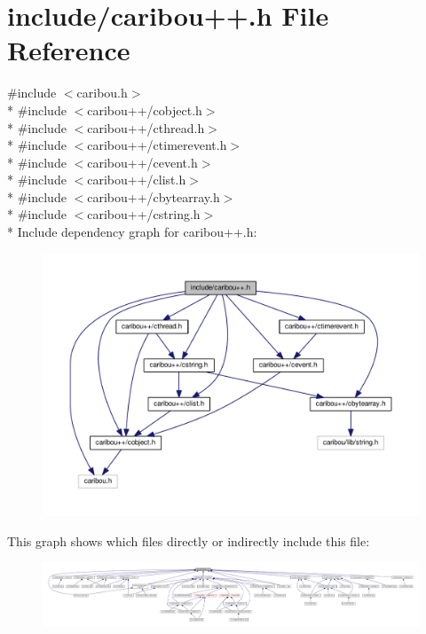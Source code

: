 \section{include/caribou++.h File Reference}
\label{caribou_09_09_8h}
{\ttfamily \#include $<$caribou.\-h$>$}\\*
{\ttfamily \#include $<$caribou++/cobject.\-h$>$}\\*
{\ttfamily \#include $<$caribou++/cthread.\-h$>$}\\*
{\ttfamily \#include $<$caribou++/ctimerevent.\-h$>$}\\*
{\ttfamily \#include $<$caribou++/cevent.\-h$>$}\\*
{\ttfamily \#include $<$caribou++/clist.\-h$>$}\\*
{\ttfamily \#include $<$caribou++/cbytearray.\-h$>$}\\*
{\ttfamily \#include $<$caribou++/cstring.\-h$>$}\\*
Include dependency graph for caribou++.h\-:\nopagebreak
\begin{figure}[H]
\begin{center}
\leavevmode
\includegraphics[width=350pt]{caribou_09_09_8h__incl}
\end{center}
\end{figure}
This graph shows which files directly or indirectly include this file\-:\nopagebreak
\begin{figure}[H]
\begin{center}
\leavevmode
\includegraphics[width=350pt]{caribou_09_09_8h__dep__incl}
\end{center}
\end{figure}

